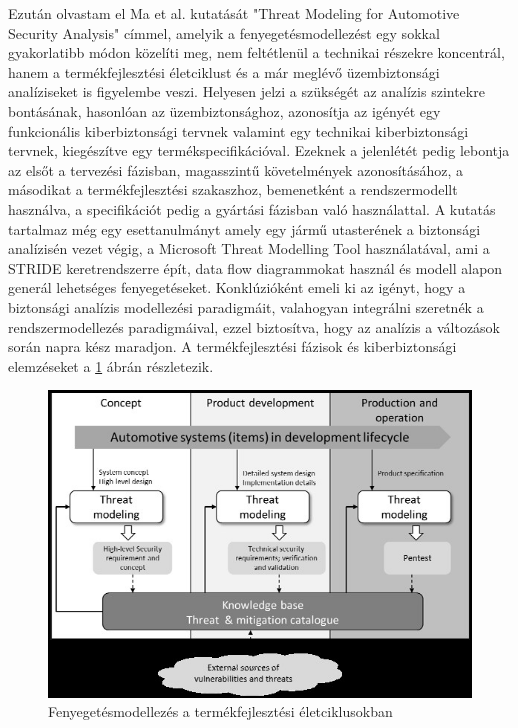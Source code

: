 Ezután olvastam el Ma et al.\cite{Ma} kutatását "Threat Modeling for Automotive Security Analysis" címmel, amelyik a fenyegetésmodellezést egy sokkal gyakorlatibb módon közelíti meg, nem feltétlenül a technikai részekre koncentrál, hanem a termékfejlesztési életciklust és a már meglévő üzembiztonsági analíziseket is figyelembe veszi. Helyesen jelzi a szükségét az analízis szintekre bontásának, hasonlóan az üzembiztonsághoz, azonosítja az igényét egy funkcionális kiberbiztonsági tervnek valamint egy technikai kiberbiztonsági tervnek, kiegészítve egy termékspecifikációval. Ezeknek a jelenlétét pedig lebontja az elsőt a tervezési fázisban, magasszintű követelmények azonosításához, a másodikat a termékfejlesztési szakaszhoz, bemenetként a rendszermodellt használva, a specifikációt pedig a gyártási fázisban való használattal. A kutatás tartalmaz még egy esettanulmányt amely egy jármű utasterének a biztonsági analízisén vezet végig, a Microsoft Threat Modelling Tool használatával, ami a STRIDE keretrendszerre épít, data flow diagrammokat használ és modell alapon generál lehetséges fenyegetéseket. Konklúzióként emeli ki az igényt, hogy a biztonsági analízis modellezési paradigmáit, valahogyan integrálni szeretnék a rendszermodellezés paradigmáival, ezzel biztosítva, hogy az analízis a változások során napra kész maradjon. A termékfejlesztési fázisok és kiberbiztonsági elemzéseket a \ref{fig:MA} ábrán részletezik.

\begin{figure}[!ht]
\centering
\includegraphics[width=150mm, keepaspectratio]{figures/03_MA.png}
\caption{Fenyegetésmodellezés a termékfejlesztési életciklusokban\cite{Ma}}
\label{fig:MA}
\end{figure}

